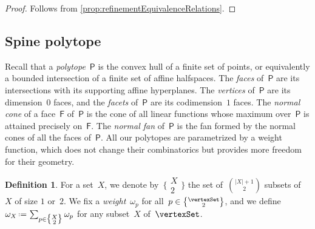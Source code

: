 \documentclass{amsart}
\theoremstyle{definition}
\newtheorem{definition}[theorem]{Definition}
\newcommand{\eqdef}{\mbox{\,\raisebox{0.2ex}{\scriptsize\ensuremath{\mathrm:}}\ensuremath{=}\,}} %
\newcommand{\darkblue}{\color{darkblue}} %
\newcommand{\defn}[1]{\textsl{\darkblue #1}} %
\newcommand{\polytope}[1]{\mathsf{#1}} %
\newcommand{\weight}{\omega} %
\newcommand{\monombinom}[1]{\big\{\!\begin{smallmatrix} #1 \\ 2 \end{smallmatrix}\!\big\}}
\begin{document}
\begin{proof}
  Follows from \cref{prop:refinementEquivalenceRelations}.
\end{proof}


\subsection{Spine polytope}
\label{subsec:spinePolytope}

Recall that a \defn{polytope}~$\polytope{P}$ is the convex hull of a finite set of points, or equivalently a bounded intersection of a finite set of affine halfspaces.
The \defn{faces} of~$\polytope{P}$ are its intersections with its supporting affine hyperplanes.
The \defn{vertices} of~$\polytope{P}$ are its dimension~$0$ faces, and the \defn{facets} of~$\polytope{P}$ are its codimension~$1$ faces.
The \defn{normal cone} of a face~$\polytope{F}$ of~$\polytope{P}$ is the cone of all linear functions whose maximum over~$\polytope{P}$ is attained precisely on~$\polytope{F}$.
The \defn{normal fan} of~$\polytope{P}$ is the fan formed by the normal cones of all the faces of~$\polytope{P}$.
All our polytopes are parametrized by a weight function, which does not change their combinatorics but provides more freedom for their geometry.

\begin{definition}
  \label{def:weight}
  For a set~$X$, we denote by~$\monombinom{X}$ the set of~$\binom{|X|+1}{2}$ subsets of~$X$ of size $1$ or~$2$.
  We fix a \defn{weight}~$\weight_p$ for all~$p \in \monombinom{\vertexSet}$, and we define~$\weight_X \eqdef \sum_{p \in \monombinom{X}} \weight_p$ for any subset~$X$ of~$\vertexSet$.
\end{definition}
\end{document}
